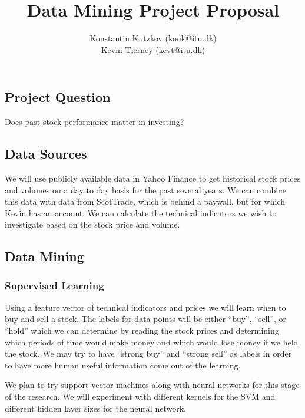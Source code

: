\documentclass[11pt]{article}
\begin{document}
\title{Data Mining Project Proposal}
\author{Konstantin Kutzkov (konk@itu.dk) \\ Kevin Tierney  (kevt@itu.dk)}

\maketitle

\vspace{-40pt}

\subsection*{Project Question}

Does past stock performance matter in investing?

\vspace{-10pt}
\subsection*{Data Sources}

We will use publicly available data in Yahoo Finance to get historical stock
prices and volumes on a day to day basis for the past several years. We can
combine this data with data from ScotTrade, which is behind a paywall, but for
which Kevin has an account.  We can calculate the technical indicators we wish
to investigate based on the stock price and volume.

\vspace{-10pt}
\subsection*{Data Mining}

\vspace{-5pt}
\subsubsection*{Supervised Learning}

Using a feature vector of technical indicators and prices we will learn when to
buy and sell a stock. The labels for data points will be either ``buy'',
``sell'', or ``hold'' which we can determine by reading the stock prices and
determining which periods of time would make money and which would lose money
if we held the stock. We may try to have ``strong buy'' and ``strong sell'' as
labels in order to have more human useful information come out of the learning.

We plan to try support vector machines along with neural networks for this
stage of the research. We will experiment with different kernels for the SVM
and different hidden layer sizes for the neural network.
\end{document}
